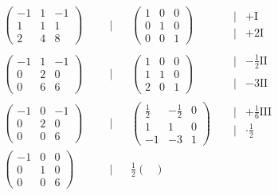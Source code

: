 \documentclass[english, parskip=full]{scrartcl}
\newcommand{\tecxt}{}
\begin{document}
\begin{align}
\begin{pmatrix}
-1&1&-1 \\
1&1&1 \\
2&4&8 
\end{pmatrix}&&&\Bigg\vert&&\begin{pmatrix}
1&0&0\\
0&1&0\\
0&0&1
\end{pmatrix}&&\begin{matrix}
& \\
\vert&+\tecxt\text{I}\\
\vert&+2\tecxt\text{I}\\
\end{matrix} \\
\begin{pmatrix}
-1&1&-1 \\
0&2&0 \\
0&6&6 
\end{pmatrix}&&&\Bigg\vert&&\begin{pmatrix}
1&0&0\\
1&1&0\\
2&0&1
\end{pmatrix}&&\begin{matrix}
\vert& -\frac{1}{2}\tecxt\text{II}\\
& \\
\vert&-3\tecxt\text{II}\\
\end{matrix}\\
\begin{pmatrix}
-1&0&-1 \\
0&2&0 \\
0&0&6 
\end{pmatrix}&&&\Bigg\vert&&\begin{pmatrix}
\frac{1}{2}&-\frac{1}{2}&0\\
1&1&0\\
-1&-3&1
\end{pmatrix}&&\begin{matrix}
\vert& +\frac{1}{6}\tecxt\text{III} \\
\vert& \cdot\frac{1}{2}\\
&
\end{matrix}\\
\begin{pmatrix}
-1&0&0 \\
0&1&0 \\
0&0&6 
\end{pmatrix}&&&\Bigg\vert&&\frac{1}{2}\begin{pmatrix}

\end{pmatrix}
\end{align}
\end{document}
